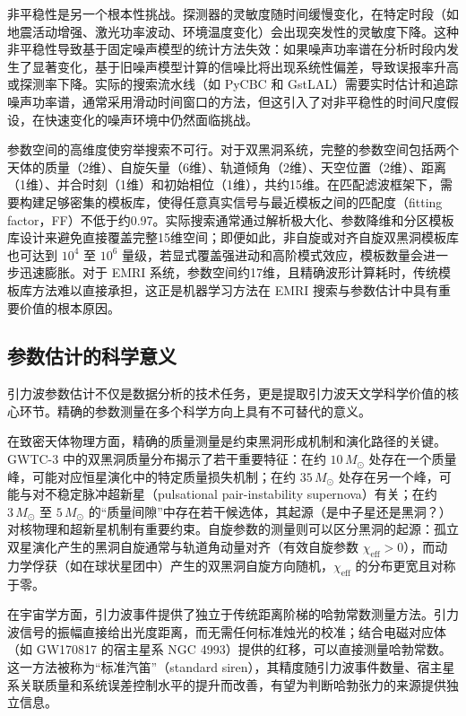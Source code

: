 非平稳性是另一个根本性挑战。探测器的灵敏度随时间缓慢变化，在特定时段（如地震活动增强、激光功率波动、环境温度变化）会出现突发性的灵敏度下降。这种非平稳性导致基于固定噪声模型的统计方法失效：如果噪声功率谱在分析时段内发生了显著变化，基于旧噪声模型计算的信噪比将出现系统性偏差，导致误报率升高或探测率下降。实际的搜索流水线（如 PyCBC 和 GstLAL）需要实时估计和追踪噪声功率谱，通常采用滑动时间窗口的方法，但这引入了对非平稳性的时间尺度假设，在快速变化的噪声环境中仍然面临挑战。

参数空间的高维度使穷举搜索不可行。对于双黑洞系统，完整的参数空间包括两个天体的质量（2维）、自旋矢量（6维）、轨道倾角（2维）、天空位置（2维）、距离（1维）、并合时刻（1维）和初始相位（1维），共约15维。在匹配滤波框架下，需要构建足够密集的模板库，使得任意真实信号与最近模板之间的匹配度（fitting factor，FF）不低于约0.97。实际搜索通常通过解析极大化、参数降维和分区模板库设计来避免直接覆盖完整15维空间；即便如此，非自旋或对齐自旋双黑洞模板库也可达到 $10^4$ 至 $10^6$ 量级，若显式覆盖强进动和高阶模式效应，模板数量会进一步迅速膨胀。对于 EMRI 系统，参数空间约17维，且精确波形计算耗时，传统模板库方法难以直接承担，这正是机器学习方法在 EMRI 搜索与参数估计中具有重要价值的根本原因。

\subsection{参数估计的科学意义}

引力波参数估计不仅是数据分析的技术任务，更是提取引力波天文学科学价值的核心环节。精确的参数测量在多个科学方向上具有不可替代的意义。

在致密天体物理方面，精确的质量测量是约束黑洞形成机制和演化路径的关键。GWTC-3 中的双黑洞质量分布揭示了若干重要特征：在约 $10\,M_\odot$ 处存在一个质量峰，可能对应恒星演化中的特定质量损失机制；在约 $35\,M_\odot$ 处存在另一个峰，可能与对不稳定脉冲超新星（pulsational pair-instability supernova）有关；在约 $3\,M_\odot$ 至 $5\,M_\odot$ 的“质量间隙”中存在若干候选体，其起源（是中子星还是黑洞？）对核物理和超新星机制有重要约束。自旋参数的测量则可以区分黑洞的起源：孤立双星演化产生的黑洞自旋通常与轨道角动量对齐（有效自旋参数 $\chi_\text{eff} > 0$），而动力学俘获（如在球状星团中）产生的双黑洞自旋方向随机，$\chi_\text{eff}$ 的分布更宽且对称于零。

在宇宙学方面，引力波事件提供了独立于传统距离阶梯的哈勃常数测量方法。引力波信号的振幅直接给出光度距离，而无需任何标准烛光的校准；结合电磁对应体（如 GW170817 的宿主星系 NGC 4993）提供的红移，可以直接测量哈勃常数。这一方法被称为“标准汽笛”（standard siren），其精度随引力波事件数量、宿主星系关联质量和系统误差控制水平的提升而改善，有望为判断哈勃张力的来源提供独立信息。

